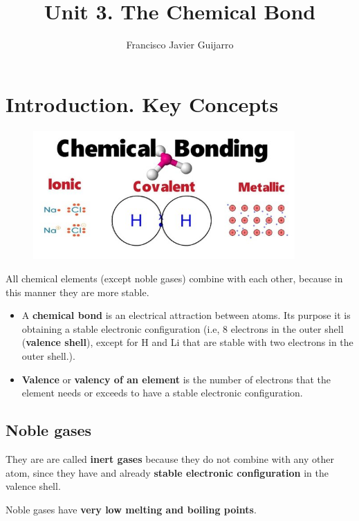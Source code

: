 \documentclass{article}
\title{Unit 3. The Chemical Bond}
\author{Francisco Javier Guijarro}
\begin{document}
	\maketitle

	\section{Introduction. Key Concepts}

		\begin{figure}[htp]
			\centering
			\includegraphics[width=10cm]{chemical_bond_1}
		\end{figure}
	
	
		All chemical elements (except noble gases) combine with each other, because in this manner they are more stable.
		
		\begin{itemize}
				\item A \textbf{chemical bond} is an electrical attraction between atoms. Its purpose it is obtaining a  stable electronic configuration (i.e,  8 electrons in the outer shell (\textbf{valence shell}), except for H and Li that are stable with two electrons in the outer shell.).
				\item \textbf{Valence} or \textbf{valency of an element} is the number of electrons that the element needs or exceeds to have a stable electronic configuration.

		\end{itemize}	
		
		\subsection*{Noble gases}

			They are are called \textbf{inert gases} because they do not combine with any other atom, since they have and already \textbf{stable electronic configuration} in the valence shell.

			Noble gases have \textbf{very low melting and boiling points}.
\end{document}
